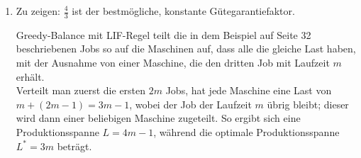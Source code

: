 \documentclass[a4paper]{scrartcl}
\newcommand{\approxalg}[1]{$#1$-Ap\-pro\-xi\-ma\-ti\-ons\-al\-go\-rith\-mus}
\newcommand{\gdw}{\ \Leftrightarrow\ }
\begin{document}
\begin{enumerate}[label=\bfseries \arabic*.]
\begin{enumerate}
\begin{proof}
            Sei $S^\ast$ eine optimale Lösung mit Summe $T^\ast$ und $S$ die
            Lösung des angegebenen Algorithmus mit Summe $T$.

            Sei $A = \{a_1, a_2, \dotsc, a_n\}$ mit $i < j \gdw a_i < a_j$.
            Da $T^\ast \leq B$ sein muss, folgt $\frac{T^\ast}{2} \leq \frac{B}{2}$.

            Nun unterscheiden wir zwei Fälle:
            \begin{itemize}
                \item $\exists a_i \in A : a_i \geq \frac{B}{2}$: \\
                    Dann ist auch $a_1 \geq \frac{B}{2}$. Da $a_1$ das größte
                    Element ist und $a_1 < B$ gilt, wird $a_1$ auf jeden Fall
                    (und zuerst) gewählt.
                    Damit gilt $T \geq \frac{B}{2} \geq \frac{T^\ast}{2}$
                \item $\lnot\exists a_i \in A : a_i \geq \frac{B}{2}$: \\
                    Angenommen, es sei $T < \frac{B}{2}$. Dann müssen noch
                    ungewählte Elemente existieren: $A \setminus S \neq \emptyset$.
                    Da $\forall a_i \in A : a_i < \frac{B}{2}$ gilt, hätte
                    jedes übrig gebliebene Element gewählt werden können.
                    Dies ist ein Widerspruch zu der im Algorithmus
                    spezifizierten Bedingung: $T + a_i \leq B \Rightarrow a_i$
                    wird gewählt.
                    Daher muss die Annahme falsch und
                    $T \geq \frac{B}{2} \geq \frac{T^\ast}{2}$ sein.
            \end{itemize}
            In beiden Fällen gilt $2 \geq \frac{T^\ast}{T}$; damit handelt es
            sich um einen \approxalg{2}.
        \end{proof}

\end{enumerate}

\item %
    Zu zeigen: $\frac{4}{3}$ ist der bestmögliche, konstante Gütegarantiefaktor.

    Greedy-Balance mit LIF-Regel teilt die in dem Beispiel auf Seite 32 beschriebenen Jobs so
    auf die Maschinen auf, dass alle die gleiche Last haben, mit der Ausnahme von einer Maschine,
    die den dritten Job mit Laufzeit $m$ erhält.\\
    Verteilt man zuerst die ersten $2m$ Jobs, hat jede Maschine eine Last von $m + (2m-1) = 3m-1$, wobei der Job
    der Laufzeit $m$ übrig bleibt; dieser wird dann einer beliebigen Maschine zugeteilt.
    So ergibt sich eine Produktionsspanne $L=4m-1$, während die optimale Produktionsspanne
    $L^*=3m$ beträgt.


\end{enumerate}
\end{document}
